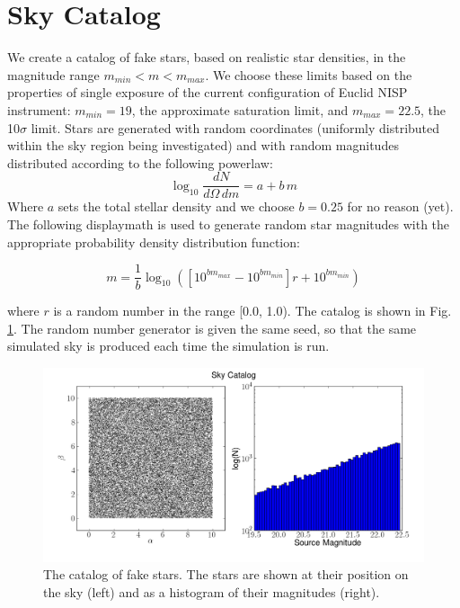 \documentclass[manuscript]{aastex}
\begin{document}
\section{Sky Catalog}
We create a catalog of fake stars, based on realistic star densities, in the magnitude range $m_{min} < m < m_{max}$. We choose these limits based on the properties of single exposure of the current configuration of Euclid NISP instrument: $m_{min} = 19$, the approximate saturation limit, and $m_{max} = 22.5$, the 10$\sigma$ limit. Stars are generated with random coordinates (uniformly distributed within the sky region being investigated) and with random magnitudes distributed according to the following powerlaw:
\begin{displaymath}
\log_{10} \frac{dN}{d\Omega\,dm} = a + b\,m
\end{displaymath}
Where $a$ sets the total stellar density and we choose $b = 0.25$ for no reason (yet).
The following displaymath is used to generate random star magnitudes with the appropriate probability density distribution function:

\begin{displaymath}
m = \frac{1}{b} \log_{10}{(\left[ 10^{b m_{max}} - 10^{b m_{min}} \right] r + 10^{b m_{min}})}
\end{displaymath}

\noindent{}where $r$ is a random number in the range [0.0, 1.0). The catalog is shown in Fig. \ref{fig:sky}. The random number generator is given the same seed, so that the same simulated sky is produced each time the simulation is run.

\begin{figure}[ht]
\begin{center}
\includegraphics[width=\textwidth]{Catalog.png}
\end{center}
\caption{The catalog of fake stars. The stars are shown at their position on the sky (left) and as a histogram of their magnitudes (right).
\label{fig:sky}}
\end{figure}
\end{document}
